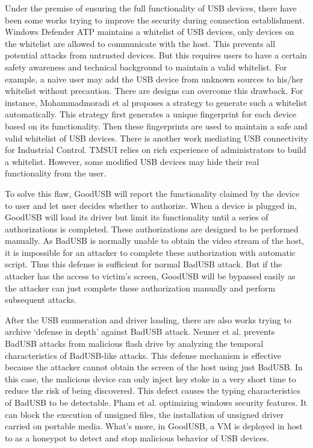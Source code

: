 Under the premise of ensuring the full functionality of USB devices, there have been some works trying to improve the security during connection establishment.
Windows Defender ATP\cite{windenfenderwhite} maintains a whitelist of USB devices, only devices on the whitelist are allowed to communicate with the host. This prevents all potential attacks from untrusted devices. But this requires users to have a certain safety awareness and technical background to maintain a valid whitelist. For example, a naive user may add the USB device from unknown sources to his/her whitelist without precaution. There are designs can overcome this drawback. For instance, Mohammadmoradi et al\cite{mohammadmoradi2018making} proposes a strategy to generate such a whitelist automatically. This strategy first generates a unique fingerprint for each device based on its functionality. Then these fingerprints are used to maintain a safe and valid whitelist of USB devices. There is another work mediating USB connectivity for Industrial Control. TMSUI\cite{yang2015tmsui} relies on rich experience of administrators to build a whitelist. However, some modified USB devices may hide their real functionality from the user.

To solve this flaw, GoodUSB\cite{tian2015defending} will report the functionality claimed by the device to user and let user decides whether to authorize. When a device is plugged in, GoodUSB will load its driver but limit its functionality until a series of authorizations is completed. These authorizations are designed to be performed manually. As BadUSB is normally unable to obtain the video stream of the host, it is impossible for an attacker to complete these authorization with automatic script. Thus this defense is sufficient for normal BadUSB attack. But if the attacker has the access to victim's screen, GoodUSB will be bypassed easily as the attacker can just complete these authorization manually and perform subsequent attacks.

After the USB enumeration and driver loading, there are also works trying to archive `defense in depth' against BadUSB attack.
Neuner et al.\cite{neuner2018usblock} prevents BadUSB attacks from malicious flash drive by analyzing the temporal characteristics of BadUSB-like attacks. This defense mechanism is effective because the attacker cannot obtain the screen of the host using just BadUSB. In this case, the malicious device can only inject key stoke in a very short time to reduce the risk of being discovered. This defect causes the typing characteristics of BadUSB to be detectable.  Pham et al. \cite{pham2010optimizing} optimizing windows security features. It can block the execution of unsigned files, the installation of unsigned driver carried on portable media. What's more, in GoodUSB, a VM is deployed in host to as a honeypot to detect and stop malicious behavior of USB devices. 

